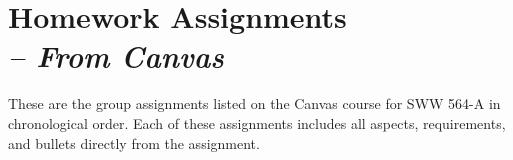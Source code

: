 \appendix
\chapter{Homework Assignments \\
\small{\textit{-- From Canvas}}
\label{Appendix::Homework}}

These are the group assignments listed on the Canvas course for SWW 564-A in chronological order. Each of these assignments includes all aspects, requirements, and bullets directly from the assignment.



